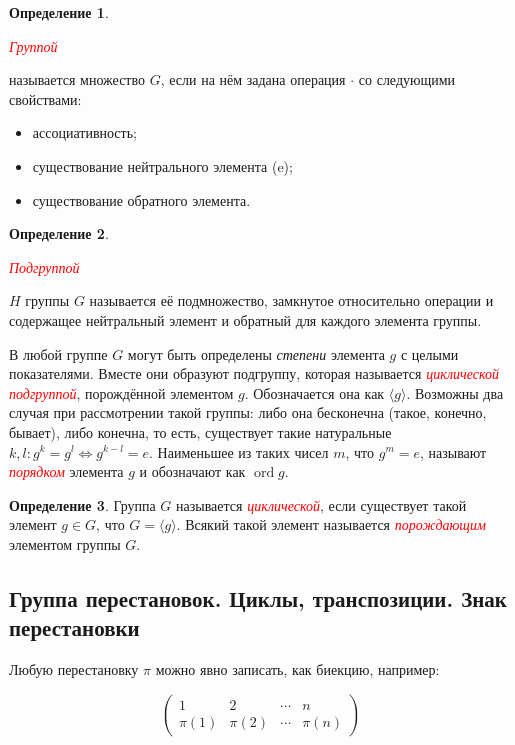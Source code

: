\documentclass[a4paper,100pt]{article}
\theoremstyle{indented}
\theoremstyle{definition}
\newtheorem{defn}{Определение}
\theoremstyle{remark}
\DeclareMathOperator{\ord}{ord}
\begin{document}
\begin{defn}
    \hypertarget{n66}{\textcolor{red}{\textit{Группой}}} называется множество $G$, если на нём задана операция $\cdot$ со следующими свойствами:\ 

    \begin{itemize}
        \item ассоциативность;
        \item существование нейтрального элемента (e);
        \item существование обратного элемента.
    \end{itemize}
\end{defn}

\begin{defn}
    \hypertarget{n67}{\textcolor{red}{\textit{Подгруппой}}} $H$ группы $G$ называется её подмножество, замкнутое относительно операции и содержащее нейтральный элемент и обратный для каждого элемента группы.
\end{defn}

В любой группе $G$ могут быть определены \textit{степени} элемента $g$ с целыми показателями. Вместе они образуют подгруппу, которая называется \hypertarget{n68}{\textcolor{red}{\textit{циклической подгруппой}}}, порождённой элементом $g$. Обозначается она как $\langle g \rangle$. Возможны два случая при рассмотрении такой группы: либо она бесконечна (такое, конечно, бывает), либо конечна, то есть, существует такие натуральные $k,l:g^k=g^l\Leftrightarrow g^{k-l}=e$. Наименьшее из таких чисел $m$, что $g^m=e$, называют \hypertarget{n69}{\textcolor{red}{\textit{порядком}}} элемента $g$ и обозначают как $\ord g$.

\begin{defn}
    Группа $G$ называется \hypertarget{n70}{\textcolor{red}{\textit{циклической}}}, если существует такой элемент $g\in G$, что $G=\langle g \rangle$. Всякий такой элемент называется \hypertarget{n71}{\textcolor{red}{\textit{порождающим}}} элементом группы $G$.
\end{defn}

\resetall

\subsection{Группа перестановок. Циклы, транспозиции. Знак перестановки}

Любую перестановку $\pi$ можно явно записать, как биекцию, например:

\begin{equation*}
    \begin{pmatrix}
        1 & 2 & \cdots & n \\
        \pi(1) & \pi(2) & \cdots & \pi(n)
    \end{pmatrix}
\end{equation*}\
\end{document}
